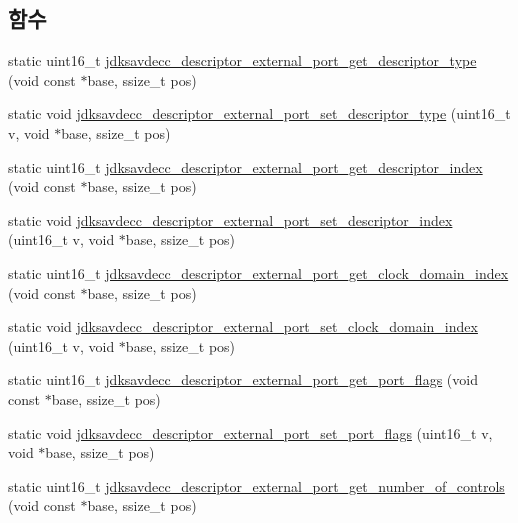 \subsection*{함수}
\begin{DoxyCompactItemize}
\item 
static uint16\+\_\+t \hyperlink{group__descriptor__external__port_ga61c9db4cf5c834e461d29e4131697348}{jdksavdecc\+\_\+descriptor\+\_\+external\+\_\+port\+\_\+get\+\_\+descriptor\+\_\+type} (void const $\ast$base, ssize\+\_\+t pos)
\item 
static void \hyperlink{group__descriptor__external__port_gaa1dce85814d727d4f049df8eb3e3bdc8}{jdksavdecc\+\_\+descriptor\+\_\+external\+\_\+port\+\_\+set\+\_\+descriptor\+\_\+type} (uint16\+\_\+t v, void $\ast$base, ssize\+\_\+t pos)
\item 
static uint16\+\_\+t \hyperlink{group__descriptor__external__port_gabd5e434d744933866d1f5683a6d8bd42}{jdksavdecc\+\_\+descriptor\+\_\+external\+\_\+port\+\_\+get\+\_\+descriptor\+\_\+index} (void const $\ast$base, ssize\+\_\+t pos)
\item 
static void \hyperlink{group__descriptor__external__port_ga1e096fc3fbfbe4782451d80a4862b89a}{jdksavdecc\+\_\+descriptor\+\_\+external\+\_\+port\+\_\+set\+\_\+descriptor\+\_\+index} (uint16\+\_\+t v, void $\ast$base, ssize\+\_\+t pos)
\item 
static uint16\+\_\+t \hyperlink{group__descriptor__external__port_gacb1f51a04c7235612fb57dabf0f95c34}{jdksavdecc\+\_\+descriptor\+\_\+external\+\_\+port\+\_\+get\+\_\+clock\+\_\+domain\+\_\+index} (void const $\ast$base, ssize\+\_\+t pos)
\item 
static void \hyperlink{group__descriptor__external__port_ga40e017cea5212448d74435a2d08c490e}{jdksavdecc\+\_\+descriptor\+\_\+external\+\_\+port\+\_\+set\+\_\+clock\+\_\+domain\+\_\+index} (uint16\+\_\+t v, void $\ast$base, ssize\+\_\+t pos)
\item 
static uint16\+\_\+t \hyperlink{group__descriptor__external__port_gab3078dc782693326c8de45c2906a23b2}{jdksavdecc\+\_\+descriptor\+\_\+external\+\_\+port\+\_\+get\+\_\+port\+\_\+flags} (void const $\ast$base, ssize\+\_\+t pos)
\item 
static void \hyperlink{group__descriptor__external__port_ga9197ee5de50905f45cbdb8e841bfe81b}{jdksavdecc\+\_\+descriptor\+\_\+external\+\_\+port\+\_\+set\+\_\+port\+\_\+flags} (uint16\+\_\+t v, void $\ast$base, ssize\+\_\+t pos)
\item 
static uint16\+\_\+t \hyperlink{group__descriptor__external__port_ga154eb190781d99c3af23aabc9567dc1b}{jdksavdecc\+\_\+descriptor\+\_\+external\+\_\+port\+\_\+get\+\_\+number\+\_\+of\+\_\+controls} (void const $\ast$base, ssize\+\_\+t pos)

\end{DoxyCompactItemize}
